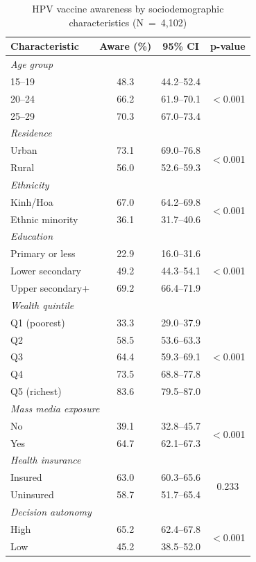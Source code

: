 \begin{table}[htbp]
\caption{HPV vaccine awareness by sociodemographic characteristics (N~=~4,102)}
\centering
\small
\begin{tabular}{|p{3.8cm}|c|c|c|}
\hline
\textbf{Characteristic} & \textbf{Aware (\%)} & \textbf{95\% CI} & \textbf{p-value} \\
\hline
\multicolumn{4}{|l|}{\textit{Age group}} \\
\hline
15--19 & 48.3 & 44.2--52.4 & \multirow{3}{*}{$<$0.001} \\
20--24 & 66.2 & 61.9--70.1 & \\
25--29 & 70.3 & 67.0--73.4 & \\
\hline
\multicolumn{4}{|l|}{\textit{Residence}} \\
\hline
Urban & 73.1 & 69.0--76.8 & \multirow{2}{*}{$<$0.001} \\
Rural & 56.0 & 52.6--59.3 & \\
\hline
\multicolumn{4}{|l|}{\textit{Ethnicity}} \\
\hline
Kinh/Hoa & 67.0 & 64.2--69.8 & \multirow{2}{*}{$<$0.001} \\
Ethnic minority & 36.1 & 31.7--40.6 & \\
\hline
\multicolumn{4}{|l|}{\textit{Education}} \\
\hline
Primary or less & 22.9 & 16.0--31.6 & \multirow{3}{*}{$<$0.001} \\
Lower secondary & 49.2 & 44.3--54.1 & \\
Upper secondary+ & 69.2 & 66.4--71.9 & \\
\hline
\multicolumn{4}{|l|}{\textit{Wealth quintile}} \\
\hline
Q1 (poorest) & 33.3 & 29.0--37.9 & \multirow{5}{*}{$<$0.001} \\
Q2 & 58.5 & 53.6--63.3 & \\
Q3 & 64.4 & 59.3--69.1 & \\
Q4 & 73.5 & 68.8--77.8 & \\
Q5 (richest) & 83.6 & 79.5--87.0 & \\
\hline
\multicolumn{4}{|l|}{\textit{Mass media exposure}} \\
\hline
No & 39.1 & 32.8--45.7 & \multirow{2}{*}{$<$0.001} \\
Yes & 64.7 & 62.1--67.3 & \\
\hline
\multicolumn{4}{|l|}{\textit{Health insurance}} \\
\hline
Insured & 63.0 & 60.3--65.6 & \multirow{2}{*}{0.233} \\
Uninsured & 58.7 & 51.7--65.4 & \\
\hline
\multicolumn{4}{|l|}{\textit{Decision autonomy}} \\
\hline
High & 65.2 & 62.4--67.8 & \multirow{2}{*}{$<$0.001} \\
Low & 45.2 & 38.5--52.0 & \\
\hline
\end{tabular}
\label{tab:awareness_bivariate}
\end{table}

